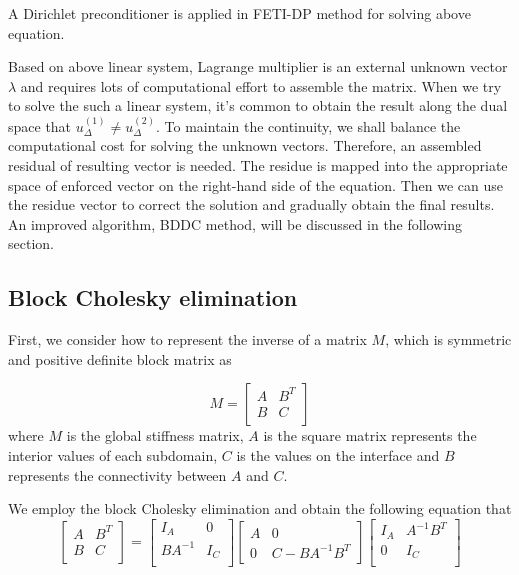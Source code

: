 A Dirichlet preconditioner is applied in FETI-DP method for solving above equation. 

Based on above linear system, Lagrange multiplier is an external unknown vector $ \lambda $ and requires lots of computational effort to assemble the matrix. When we try to solve the such a linear system, it's common to obtain the result along the dual space that $ u_{\Delta}^{(1)} \neq  u_{\Delta}^{(2)}$. To maintain the continuity, we shall balance the computational cost for solving the unknown vectors. Therefore, an assembled residual of resulting vector is needed. The residue is mapped into the appropriate space of enforced vector on the right-hand side of the equation. Then we can use the residue vector to correct the solution and gradually obtain the final results. An improved algorithm, BDDC method, will be discussed in the following section.

\subsection{Block Cholesky elimination}

First, we consider how to represent the inverse of a matrix $ M $, which is symmetric and positive definite block matrix as

\begin{equation}\label{eq:linearSys}
M = \begin{bmatrix}
A & B^{T} \\
B & C\\
\end{bmatrix}
\end{equation}
where $ M $ is the global stiffness matrix, $ A $ is the square matrix represents the interior values of each subdomain, $ C $ is the values on the interface and $ B $ represents the connectivity between $ A $ and $ C $.

We employ the block Cholesky elimination and obtain the following equation that
\begin{equation}\label{eq:schur1}
\begin{bmatrix}
A & B^{T} \\ B & C \\
\end{bmatrix} = 
\begin{bmatrix}
I_{A} & 0 \\ BA^{-1} & I_{C}\\
\end{bmatrix} \begin{bmatrix}
A & 0 \\ 0 & C - BA^{-1} B^{T}
\end{bmatrix}
\begin{bmatrix}
I_{A} & A^{-1} B^{T} \\ 0 & I_{C} \\
\end{bmatrix}
\end{equation}

